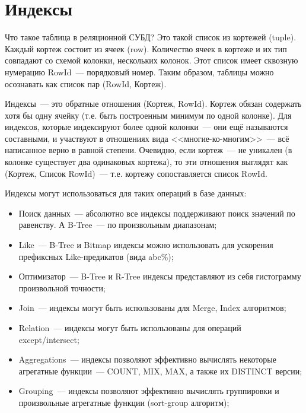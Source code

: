 \chapter{Индексы}

\begin{epigraphs}
\end{epigraphs}

Что такое таблица в реляционной СУБД? Это такой список из кортежей (tuple). Каждый кортеж состоит из ячеек (row). Количество ячеек в кортеже и их тип совпадают со схемой колонки, нескольких колонок. Этот список имеет сквозную нумерацию RowId~--- порядковый номер. Таким образом, таблицы можно осознавать как список пар (RowId, Кортеж).

Индексы~--- это обратные отношения (Кортеж, RowId). Кортеж обязан содержать хотя бы одну ячейку (т.е. быть построенным минимум по одной колонке). Для индексов, которые индексируют более одной колонки~--- они ещё называются составными, и участвуют в отношениях вида <<многие-ко-многим>>~--- всё написанное верно в равной степени. Очевидно, если кортеж~--- не уникален (в колонке существует два одинаковых кортежа), то эти отношения выглядят как (Кортеж, Список RowId)~--- т.е. кортежу сопоставляется список RowId.

Индексы могут использоваться для таких операций в базе данных:

\begin{itemize}
  \item Поиск данных~--- абсолютно все индексы поддерживают поиск значений по равенству. А B-Tree~--- по произвольным диапазонам;
  \item Like~--- B-Tree и Bitmap индексы можно использовать для ускорения префиксных Like-предикатов (вида abc\%);
  \item Оптимизатор~--- B-Tree и R-Tree индексы представляют из себя гистограмму произвольной точности;
  \item Join~--- индексы могут быть использованы для Merge, Index алгоритмов;
  \item Relation~--- индексы могут быть использованы для операций except/intersect;
  \item Aggregations~--- индексы позволяют эффективно вычислять некоторые агрегатные функции~--- COUNT, MIX, MAX, а также их DISTINCT версии;
  \item Grouping~--- индексы позволяют эффективно вычислять группировки и произвольные агрегатные функции (sort-group алгоритм);
\end{itemize}




